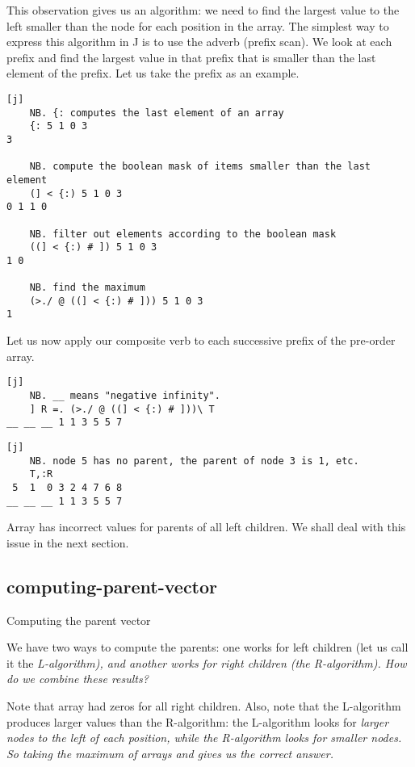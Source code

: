\documentclass{article}
\begin{document}
This observation gives us an algorithm: we need to find the largest value to the left smaller than the node for each position in the array.
The simplest way to express this algorithm in J is to use the \href{https://code.jsoftware.com/wiki/Vocabulary/bslash}{\code{\}}} adverb (prefix scan).
We look at each prefix and find the largest value in that prefix that is smaller than the last element of the prefix.
Let us take the prefix  as an example.

\begin{verbatim}[j]
    NB. {: computes the last element of an array
    {: 5 1 0 3
3

    NB. compute the boolean mask of items smaller than the last element
    (] < {:) 5 1 0 3
0 1 1 0

    NB. filter out elements according to the boolean mask
    ((] < {:) # ]) 5 1 0 3
1 0

    NB. find the maximum
    (>./ @ ((] < {:) # ])) 5 1 0 3
1
\end{verbatim}

Let us now apply our composite verb to each successive prefix of the pre-order array.

\begin{verbatim}[j]
    NB. __ means "negative infinity".
    ] R =. (>./ @ ((] < {:) # ]))\ T
__ __ __ 1 1 3 5 5 7
\end{verbatim}

\begin{verbatim}[j]
    NB. node 5 has no parent, the parent of node 3 is 1, etc.
    T,:R
 5  1  0 3 2 4 7 6 8
__ __ __ 1 1 3 5 5 7
\end{verbatim}

Array  has incorrect values for parents of all left children.
We shall deal with this issue in the next section.

\subsection{computing-parent-vector}{Computing the parent vector}

We have two ways to compute the parents: one works for left children (let us call it the \em{L-algorithm}), and another works for right children (the \em{R-algorithm}).
How do we combine these results?

Note that array  had zeros for all right children. 
Also, note that the L-algorithm produces larger values than the R-algorithm: the L-algorithm looks for \em{larger} nodes to the left of each position, while the R-algorithm looks for \em{smaller} nodes.
So taking the maximum of arrays  and  gives us the correct answer.
\end{document}
